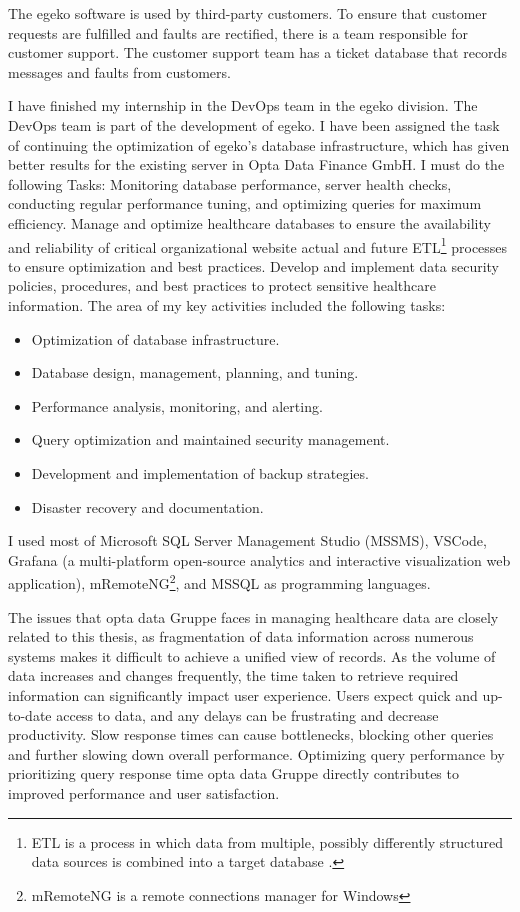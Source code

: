 The egeko software is used by third-party customers. To ensure that customer requests are fulfilled and faults are rectified, there is a team responsible for customer support. The customer support team has a ticket database that records messages and faults from customers.\vspace{.4cm}

I have finished my internship in the DevOps team in the egeko division. The DevOps team is part of the development of egeko. I have been assigned the task of continuing the optimization of egeko's database infrastructure, which has given better results for the existing server in Opta Data Finance GmbH. I must do the following Tasks: Monitoring database performance, server health checks, conducting regular performance tuning, and optimizing queries for maximum efficiency. Manage and optimize healthcare databases to ensure the availability and reliability of critical organizational website actual and future ETL\footnote{ ETL is a process in which data from multiple, possibly differently structured data sources is combined into a target database .} processes to ensure optimization and best practices. Develop and implement data security policies, procedures, and best practices to protect sensitive healthcare information. The area of my key activities included the following tasks:\vspace{.4cm}
\begin{itemize}
    \item Optimization of database infrastructure.
    \item Database design, management, planning, and tuning.
    \item Performance analysis, monitoring, and alerting.
    \item Query optimization and maintained security management.
    \item Development and implementation of backup strategies.
    \item Disaster recovery and documentation.
\end{itemize}

I used most of Microsoft SQL Server Management Studio (MSSMS), VSCode, Grafana (a multi-platform open-source analytics and interactive visualization web application), mRemoteNG\footnote{mRemoteNG is a remote connections manager for Windows}, and MSSQL as programming languages.\vspace{.4cm}

The issues that opta data Gruppe faces in managing healthcare data are closely related to this thesis, as fragmentation of data information across numerous systems makes it difficult to achieve a unified view of records. As the volume of data increases and changes frequently, the time taken to retrieve required information can significantly impact user experience. Users expect quick and up-to-date access to data, and any delays can be frustrating and decrease productivity. Slow response times can cause bottlenecks, blocking other queries and further slowing down overall performance. Optimizing query performance by prioritizing query response time opta data Gruppe directly contributes to improved performance and user satisfaction.

